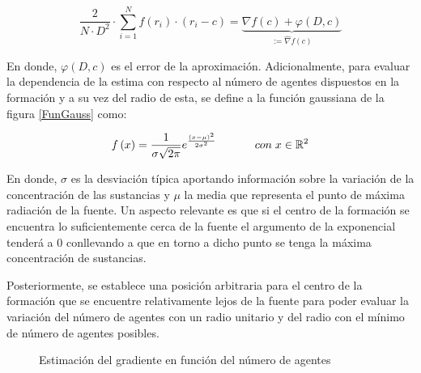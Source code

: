 \begin{equation}\label{Fun_Esti}
	\frac{2}{N\cdot{D}^2}\cdot\sum_{i=1}^{N}f(r_{i})\cdot(r_{i}-c)=\underbrace{\nabla{f}\left(c\right) + \varphi\left(D,c\right)}_{:=\hat{\nabla}{f}\left(c\right)}
\end{equation}

En donde, $\varphi\left(D,c\right)$ es el error de la aproximación. Adicionalmente, para evaluar la dependencia de la estima con respecto al número de agentes dispuestos en la formación y a su vez del radio de esta, se define a la función gaussiana de la figura \ref{FunGauss} como:

\begin{equation}\label{Gaussiana_base}
	f\left(x\right)=\frac{1}{\sigma\sqrt{2\pi}}e^{\frac{\left(x-\mu\right)^2}{2\sigma^2}}\hspace{12mm}con\hspace{1mm}x\in\mathbb{R}^{2}
\end{equation}

En donde, $\sigma$ es la desviación típica aportando información sobre la variación de la concentración de las sustancias y $\mu$ la media que representa el punto de máxima radiación de la fuente. Un aspecto relevante es que si el centro de la formación se encuentra lo suficientemente cerca de la fuente el argumento de la exponencial tenderá a 0 conllevando a que en torno a dicho punto se tenga la máxima concentración de sustancias.

Posteriormente, se establece una posición arbitraria para el centro de la formación que se encuentre relativamente lejos de la fuente para poder evaluar la variación del número de agentes con un radio unitario y del radio con el mínimo de número de agentes posibles.

\newpage
\begin{figure}[htb]
  \begin{center}
    \caption{Estimación del gradiente en función del número de agentes}
    \label{NAGENTSEST}
  \end{center}
\end{figure}

